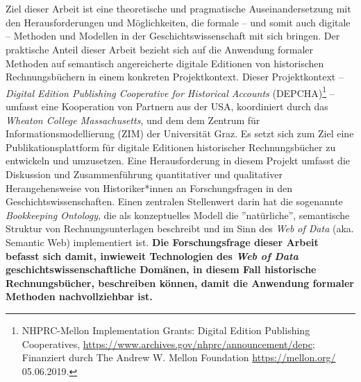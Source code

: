 \documentclass[12pt,a4paper]{article}
\begin{document}
\\
\\
Ziel dieser Arbeit ist eine theoretische und pragmatische Auseinandersetzung mit den Herausforderungen und Möglichkeiten, die formale -- und somit auch digitale -- Methoden und Modellen in der Geschichtswissenschaft mit sich bringen. Der praktische Anteil dieser Arbeit bezieht sich auf die Anwendung formaler Methoden auf semantisch angereicherte digitale Editionen von historischen Rechnungsbüchern in einem konkreten Projektkontext. Dieser Projektkontext -- \textit{Digital Edition Publishing Cooperative for Historical Accounts} (DEPCHA)\footnote{NHPRC-Mellon Implementation Grants: Digital Edition Publishing Cooperatives, \url{https://www.archives.gov/nhprc/announcement/depc}; Finanziert durch The Andrew W. Mellon Foundation \url{https://mellon.org/} 05.06.2019.} -- umfasst eine Kooperation von Partnern aus der USA, koordiniert durch das \textit{Wheaton College Massachusetts}, und dem dem Zentrum für Informationsmodellierung (ZIM) der Universität Graz. Es setzt sich zum Ziel eine Publikationsplattform für digitale Editionen historischer Rechnungsbücher zu entwickeln und umzusetzen. Eine Herausforderung in diesem Projekt umfasst die Diskussion und Zusammenführung quantitativer und qualitativer Herangehensweise  von Historiker*innen an Forschungsfragen in den Geschichtswissenschaften. Einen zentralen Stellenwert darin hat die sogenannte \textit{Bookkeeping Ontology}, die als konzeptuelles Modell die ''natürliche'', semantische Struktur von Rechnungsunterlagen beschreibt und im Sinn des \textit{Web of Data} (aka. Semantic Web) implementiert ist. \textbf{Die Forschungsfrage dieser Arbeit befasst sich damit, inwieweit Technologien des \textit{Web of Data} geschichtswissenschaftliche Domänen, in diesem Fall historische Rechnungsbücher, beschreiben können, damit die Anwendung formaler Methoden nachvollziehbar ist.} 
\end{document}
